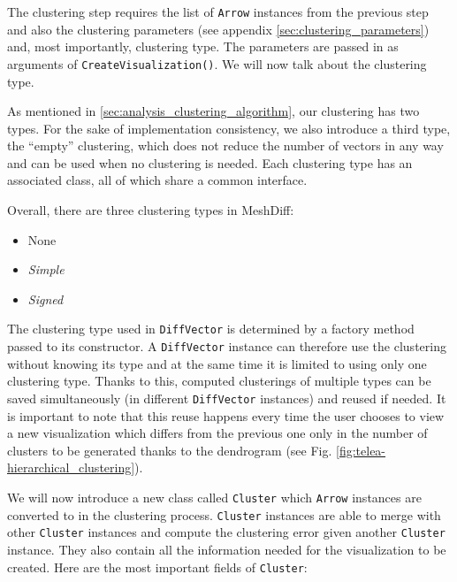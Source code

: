 The clustering step requires the list of \verb+Arrow+ instances from the previous step and also the clustering parameters (see appendix \ref{sec:clustering_parameters}) and, most importantly, clustering type. The parameters are passed in as arguments of \verb+CreateVisualization()+. We will now talk about the clustering type.

As mentioned in \ref{sec:analysis_clustering_algorithm}, our clustering has two types. For the sake of implementation consistency, we also introduce a third type, the ``empty'' clustering, which does not reduce the number of vectors in any way and can be used when no clustering is needed. Each clustering type has an associated class, all of which share a common interface.

Overall, there are three clustering types in MeshDiff:

\begin{itemize}
\item None
\item {\it Simple}
\item {\it Signed}
\end{itemize}

The clustering type used in \verb+DiffVector+ is determined by a factory method passed to its constructor. A \verb+DiffVector+ instance can therefore use the clustering without knowing its type and at the same time it is limited to using only one clustering type. Thanks to this, computed clusterings of multiple types can be saved simultaneously (in different \verb+DiffVector+ instances) and reused if needed. It is important to note that this reuse happens every time the user chooses to view a new visualization which differs from the previous one only in the number of clusters to be generated thanks to the dendrogram (see Fig. \ref{fig:telea-hierarchical_clustering}).

We will now introduce a new class called \verb+Cluster+ which \verb+Arrow+ instances are converted to in the clustering process. \verb+Cluster+ instances are able to merge with other \verb+Cluster+ instances and compute the clustering error given another \verb+Cluster+ instance. They also contain all the information needed for the visualization to be created. Here are the most important fields of \verb+Cluster+:

